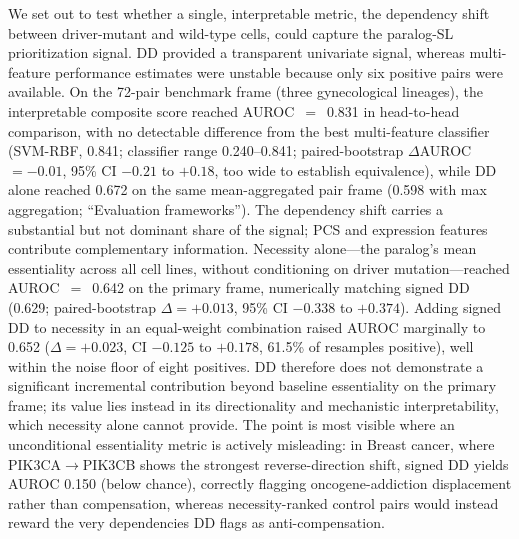 \documentclass[11pt,a4paper]{article}
\begin{document}
We set out to test whether a single, interpretable metric, the dependency shift between driver-mutant and wild-type cells, could capture the paralog-SL prioritization signal. DD provided a transparent univariate signal, whereas multi-feature performance estimates were unstable because only six positive pairs were available. On the 72-pair benchmark frame (three gynecological lineages), the interpretable composite score reached AUROC~$=$~0.831 in head-to-head comparison, with no detectable difference from the best multi-feature classifier (SVM-RBF, 0.841; classifier range 0.240--0.841; paired-bootstrap $\Delta$AUROC~$=-0.01$, 95\% CI $-0.21$ to $+0.18$, too wide to establish equivalence), while DD alone reached 0.672 on the same mean-aggregated pair frame (0.598 with max aggregation; ``Evaluation frameworks''). The dependency shift carries a substantial but not dominant share of the signal; PCS and expression features contribute complementary information. Necessity alone—the paralog's mean essentiality across all cell lines, without conditioning on driver mutation—reached AUROC~$=$~0.642 on the primary frame, numerically matching signed DD (0.629; paired-bootstrap $\Delta=+0.013$, 95\% CI $-0.338$ to $+0.374$). Adding signed DD to necessity in an equal-weight combination raised AUROC marginally to 0.652 ($\Delta=+0.023$, CI $-0.125$ to $+0.178$, 61.5\% of resamples positive), well within the noise floor of eight positives. DD therefore does not demonstrate a significant incremental contribution beyond baseline essentiality on the primary frame; its value lies instead in its directionality and mechanistic interpretability, which necessity alone cannot provide. The point is most visible where an unconditional essentiality metric is actively misleading: in Breast cancer, where PIK3CA$\rightarrow$PIK3CB shows the strongest reverse-direction shift, signed DD yields AUROC 0.150 (below chance), correctly flagging oncogene-addiction displacement rather than compensation, whereas necessity-ranked control pairs would instead reward the very dependencies DD flags as anti-compensation.
\end{document}
